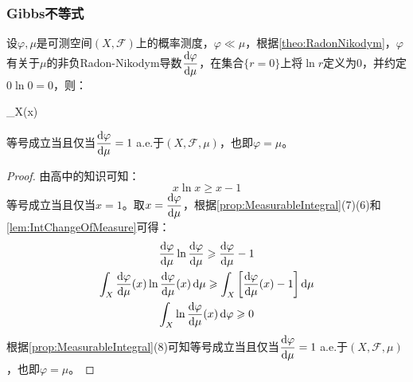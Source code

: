 \subsubsection{Gibbs不等式}
\begin{theorem}
	设$\varphi,\mu$是可测空间$(X,\mathscr{F})$上的概率测度，$\varphi\ll\mu$，根据\cref{theo:RadonNikodym}，$\varphi$有关于$\mu$的非负Radon-Nikodym导数$\dfrac{\mathop{}\!\mathrm{d}\varphi}{\mathop{}\!\mathrm{d}\mu}$，在集合$\{r=0\}$上将$\ln r$定义为$0$，并约定$0\ln0=0$，则：
	\begin{inequality*}\label{ineq:Gibbs}
		\int_{X}\ln\frac{\dif\varphi}{\dif\mu}(x)\dif\varphi{}
	\end{inequality*}
	等号成立当且仅当$\dfrac{\mathop{}\!\mathrm{d}\varphi}{\mathop{}\!\mathrm{d}\mu}=1\;$a.e.于$(X,\mathscr{F},\mu)$，也即$\varphi=\mu$。
\end{theorem}
\begin{proof}
	由高中的知识可知：
	\begin{equation*}
		x\ln x\geqslant x-1
	\end{equation*}
	等号成立当且仅当$x=1$。取$x=\dfrac{\mathop{}\!\mathrm{d}\varphi}{\mathop{}\!\mathrm{d}\mu}$，根据\cref{prop:MeasurableIntegral}(7)(6)和\cref{lem:IntChangeOfMeasure}可得：
	\begin{gather*}
		\frac{\dif\varphi}{\dif\mu}\ln\frac{\dif\varphi}{\dif\mu}\geqslant\frac{\dif\varphi}{\dif\mu}-1 \\
		\int_{X}\frac{\dif\varphi}{\dif\mu}(x)\ln\frac{\dif\varphi}{\dif\mu}(x)\dif\mu\geqslant\int_{X}\left[\frac{\dif\varphi}{\dif\mu}(x)-1\right]\dif\mu \\
		\int_{X}\ln\frac{\dif\varphi}{\dif\mu}(x)\dif\varphi\geqslant0
	\end{gather*}
	根据\cref{prop:MeasurableIntegral}(8)可知等号成立当且仅当$\dfrac{\mathop{}\!\mathrm{d}\varphi}{\mathop{}\!\mathrm{d}\mu}=1\;$a.e.于$(X,\mathscr{F},\mu)$，也即$\varphi=\mu$。
\end{proof}
